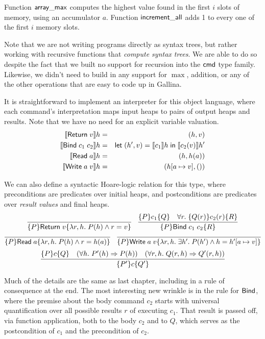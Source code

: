 \documentclass{amsbook}
\theoremstyle{definition}
\theoremstyle{remark}
\numberwithin{section}{chapter}
\numberwithin{equation}{chapter}
\begin{document}
Function $\mathsf{array\_max}$ computes the highest value found in the first $i$ slots of memory, using an accumulator $a$.
Function $\mathsf{increment\_all}$ adds 1 to every one of the first $i$ memory slots.

Note that we are not writing programs directly as syntax trees, but rather working with recursive functions that \emph{compute syntax trees}.
We are able to do so despite the fact that we built no support for recursion into the $\mathsf{cmd}$ type family.
Likewise, we didn't need to build in any support for $\max$, addition, or any of the other operations that are easy to code up in Gallina.

It is straightforward to implement an interpreter for this object language, where each command's interpretation maps input heaps to pairs of output heaps and results.
Note that we have no need for an explicit variable valuation.
\begin{eqnarray*}
  {\left \llbracket \mathsf{Return} \; v \right \rrbracket}h &=& (h, v) \\
  {\left \llbracket \mathsf{Bind} \; c_1 \; c_2 \right \rrbracket}h &=& \mathsf{let} \; (h', v) = {\left \llbracket c_1 \right \rrbracket}h \; \mathsf{in} \; {\left \llbracket c_2(v) \right \rrbracket}h' \\
  {\left \llbracket \mathsf{Read} \; a \right \rrbracket}h &=& (h, h(a)) \\
  {\left \llbracket \mathsf{Write} \; a \; v \right \rrbracket}h &=& (h[a \mapsto v], ())
\end{eqnarray*}

We can also define a syntactic Hoare-logic relation for this type, where preconditions are predicates over initial heaps, and postconditions are predicates over \emph{result values} and final heaps.
$$\infer{\hoare{P}{\mt{Return} \; v}{\lambda r, h. \; P(h) \land r = v}}{}
\quad \infer{\hoare{P}{\mt{Bind} \; c_1 \; c_2}{R}}{
  \hoare{P}{c_1}{Q}
  & \forall r. \; \hoare{Q(r)}{c_2(r)}{R}
}$$
$$\infer{\hoare{P}{\mt{Read} \; a}{\lambda r, h. \; P(h) \land r = \msel{h}{a}}}{}
\quad \infer{\hoare{P}{\mt{Write} \; a \; v}{\lambda r, h. \; \exists h'. \; P(h') \land h = \mupd{h'}{a}{v}}}{}$$
$$\infer{\hoare{P'}{c}{Q'}}{
  \hoare{P}{c}{Q}
  & (\forall h. \; P'(h) \Rightarrow P(h))
  & (\forall r, h. \; Q(r, h) \Rightarrow Q'(r, h))
}$$

Much of the details are the same as last chapter, including in a rule of consequence at the end.
The most interesting new wrinkle is in the rule for $\mathsf{Bind}$, where the premise about the body command $c_2$ starts with universal quantification over all possible results $r$ of executing $c_1$.
That result is passed off, via function application, both to the body $c_2$ and to $Q$, which serves as the postcondition of $c_1$ and the precondition of $c_2$.
\end{document}
